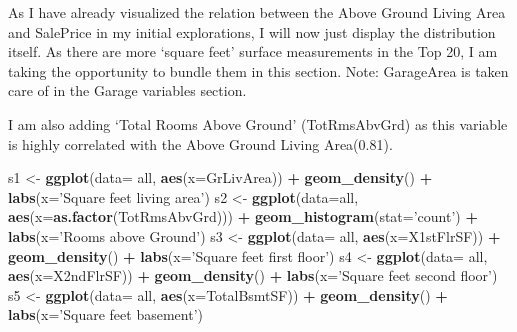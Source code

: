 \documentclass[]{article}
\newenvironment{Shaded}{\begin{snugshade}}{\end{snugshade}}
\newcommand{\KeywordTok}[1]{\textcolor[rgb]{0.13,0.29,0.53}{\textbf{#1}}}
\newcommand{\DataTypeTok}[1]{\textcolor[rgb]{0.13,0.29,0.53}{#1}}
\newcommand{\StringTok}[1]{\textcolor[rgb]{0.31,0.60,0.02}{#1}}
\newcommand{\OperatorTok}[1]{\textcolor[rgb]{0.81,0.36,0.00}{\textbf{#1}}}
\newcommand{\NormalTok}[1]{#1}
\begin{document}
As I have already visualized the relation between the Above Ground
Living Area and SalePrice in my initial explorations, I will now just
display the distribution itself. As there are more `square feet' surface
measurements in the Top 20, I am taking the opportunity to bundle them
in this section. Note: GarageArea is taken care of in the Garage
variables section.

I am also adding `Total Rooms Above Ground' (TotRmsAbvGrd) as this
variable is highly correlated with the Above Ground Living Area(0.81).

\begin{Shaded}
\begin{Highlighting}[]
\NormalTok{s1 <-}\StringTok{ }\KeywordTok{ggplot}\NormalTok{(}\DataTypeTok{data=}\NormalTok{ all, }\KeywordTok{aes}\NormalTok{(}\DataTypeTok{x=}\NormalTok{GrLivArea)) }\OperatorTok{+}
\StringTok{        }\KeywordTok{geom_density}\NormalTok{() }\OperatorTok{+}\StringTok{ }\KeywordTok{labs}\NormalTok{(}\DataTypeTok{x=}\StringTok{'Square feet living area'}\NormalTok{)}
\NormalTok{s2 <-}\StringTok{ }\KeywordTok{ggplot}\NormalTok{(}\DataTypeTok{data=}\NormalTok{all, }\KeywordTok{aes}\NormalTok{(}\DataTypeTok{x=}\KeywordTok{as.factor}\NormalTok{(TotRmsAbvGrd))) }\OperatorTok{+}
\StringTok{        }\KeywordTok{geom_histogram}\NormalTok{(}\DataTypeTok{stat=}\StringTok{'count'}\NormalTok{) }\OperatorTok{+}\StringTok{ }\KeywordTok{labs}\NormalTok{(}\DataTypeTok{x=}\StringTok{'Rooms above Ground'}\NormalTok{)}
\NormalTok{s3 <-}\StringTok{ }\KeywordTok{ggplot}\NormalTok{(}\DataTypeTok{data=}\NormalTok{ all, }\KeywordTok{aes}\NormalTok{(}\DataTypeTok{x=}\NormalTok{X1stFlrSF)) }\OperatorTok{+}
\StringTok{        }\KeywordTok{geom_density}\NormalTok{() }\OperatorTok{+}\StringTok{ }\KeywordTok{labs}\NormalTok{(}\DataTypeTok{x=}\StringTok{'Square feet first floor'}\NormalTok{)}
\NormalTok{s4 <-}\StringTok{ }\KeywordTok{ggplot}\NormalTok{(}\DataTypeTok{data=}\NormalTok{ all, }\KeywordTok{aes}\NormalTok{(}\DataTypeTok{x=}\NormalTok{X2ndFlrSF)) }\OperatorTok{+}
\StringTok{        }\KeywordTok{geom_density}\NormalTok{() }\OperatorTok{+}\StringTok{ }\KeywordTok{labs}\NormalTok{(}\DataTypeTok{x=}\StringTok{'Square feet second floor'}\NormalTok{)}
\NormalTok{s5 <-}\StringTok{ }\KeywordTok{ggplot}\NormalTok{(}\DataTypeTok{data=}\NormalTok{ all, }\KeywordTok{aes}\NormalTok{(}\DataTypeTok{x=}\NormalTok{TotalBsmtSF)) }\OperatorTok{+}
\StringTok{        }\KeywordTok{geom_density}\NormalTok{() }\OperatorTok{+}\StringTok{ }\KeywordTok{labs}\NormalTok{(}\DataTypeTok{x=}\StringTok{'Square feet basement'}\NormalTok{)}

\end{Highlighting}
\end{Shaded}
\end{document}
